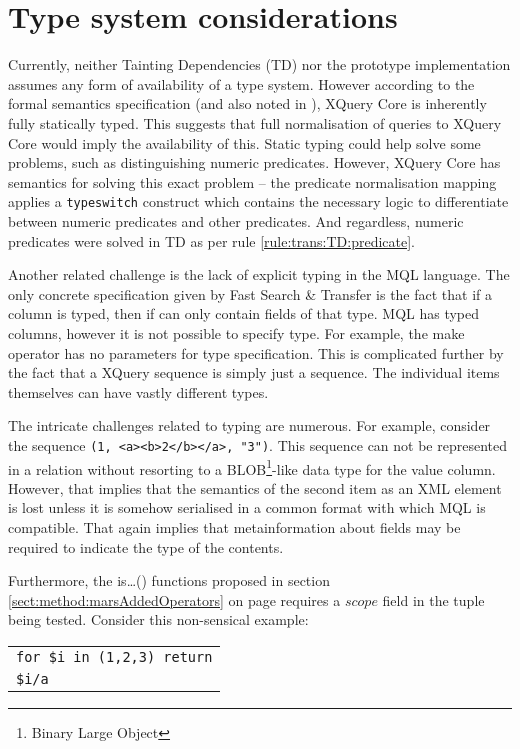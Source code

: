 \section{Type system considerations}
\label{sect:disc:typeSystem}
Currently, neither Tainting Dependencies (TD) nor the prototype
implementation assumes any form of availability of a type system. However
according to the formal semantics specification\cite{xquery_semantics} (and
also noted in \cite{pathfinder_compiling_xquery}), XQuery Core is inherently
fully statically typed. This suggests that full normalisation of queries to
XQuery Core would imply the availability of this. Static typing could help
solve some problems, such as distinguishing numeric predicates. However, XQuery
Core has semantics for solving this exact problem -- the predicate normalisation
mapping applies a \texttt{typeswitch} construct which contains the necessary logic to
differentiate between numeric predicates and other predicates. And regardless,
numeric predicates were solved in TD as per rule \ref{rule:trans:TD:predicate}.

Another related challenge is the lack of explicit typing in the MQL language.
The only concrete specification given by Fast Search \& Transfer is the fact that if a column is
typed, then if can only contain fields of that type. MQL has typed columns,
however it is not possible to specify type. For example, the \textsf{make}
operator has no parameters for type specification. This is complicated further
by the fact that a XQuery sequence is simply just a sequence. The individual
items themselves can have vastly different types.

The intricate challenges related to typing are numerous. For example, consider
the sequence \texttt{(1, <a><b>2</b></a>, "3")}. This sequence can not be
represented in a relation without resorting to a BLOB\footnote{Binary
Large Object}-like data type for the value column. However, that implies that
the semantics of the second item as an XML element is lost unless it is somehow
serialised in a common format with which MQL is compatible. That again implies
that metainformation about fields may be required to indicate the type of the
contents.

Furthermore, the \textsf{is\ldots{()}} functions proposed in section
\ref{sect:method:marsAddedOperators} on page
\pageref{sect:method:marsAddedOperators} requires a $scope$ field in the tuple
being tested. Consider this non-sensical example:

\begin{center}
\begin{tabular}{l}
\texttt{for \$i in (1,2,3) return} \\ \quad
\texttt{\$i/a}
\end{tabular}
\end{center}

